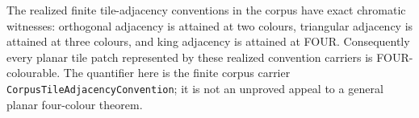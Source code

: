 \begin{theorem}\label{thm:realized-tile-adjacency-chromatic-numbers}\leanok{}
The realized finite tile-adjacency conventions in the corpus have exact
chromatic witnesses: orthogonal adjacency is attained at two colours,
triangular adjacency is attained at three colours, and king adjacency is
attained at FOUR.  Consequently every planar tile patch represented by these
realized convention carriers is FOUR-colourable.  The quantifier here is the
finite corpus carrier \texttt{CorpusTileAdjacencyConvention}; it is not an
unproved appeal to a general planar four-colour theorem.
\end{theorem}

